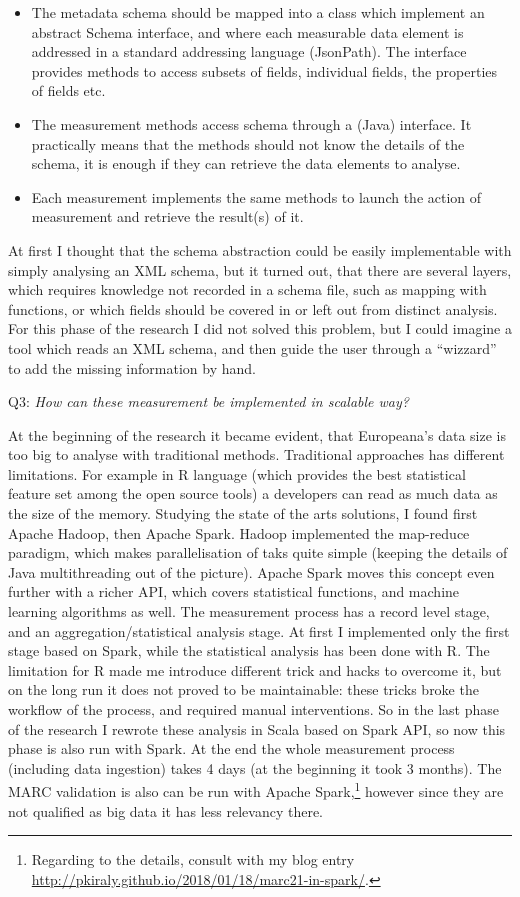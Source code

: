 \begin{itemize}
  \item The metadata schema should be mapped into a class which implement an abstract Schema interface, and where each measurable data element is addressed in a standard addressing language (JsonPath). The interface provides methods to access subsets of fields, individual fields, the properties of fields etc.
  \item The measurement methods access schema through a (Java) interface. It practically means that the methods should not know the details of the schema, it is enough if they can retrieve the data elements to analyse.
  \item Each measurement implements the same methods to launch the action of measurement and retrieve the result(s) of it.
\end{itemize}

At first I thought that the schema abstraction could be easily implementable with simply analysing an XML schema, but it turned out, that there are several layers, which requires knowledge not recorded in a schema file, such as mapping with functions, or which fields should be covered in or  left out from distinct analysis. For this phase of the research I did not solved this problem, but I could imagine a tool which reads an XML schema, and then guide the user through a ``wizzard'' to add the missing information by hand.


Q3: \emph{How can these measurement be implemented in scalable way?}

At the beginning of the research it became evident, that Europeana's data size is too big to analyse with traditional methods. Traditional approaches has different limitations. For example in R language (which provides the best statistical feature set among the open source tools) a developers can read as much data as the size of the memory. Studying the state of the arts solutions, I found first Apache Hadoop, then Apache Spark. Hadoop implemented the map-reduce paradigm, which makes parallelisation of taks quite simple (keeping the details of Java multithreading out of the picture). Apache Spark moves this concept even further with a richer API, which covers statistical functions, and machine learning algorithms as well. The measurement process has a record level stage, and an aggregation/statistical analysis stage. At first I implemented only the first stage based on Spark, while the statistical analysis has been done with R. The limitation for R made me introduce different trick and hacks to overcome it, but on the long run it does not proved to be maintainable: these tricks broke the workflow of the process, and required manual interventions. So in the last phase of the research I rewrote these analysis in Scala based on Spark API, so now this phase is also run with Spark. At the end the whole measurement process (including data ingestion) takes 4 days (at the beginning it took 3 months). The MARC validation is also can be run with Apache Spark,\footnote{Regarding to the details, consult with my blog entry \url{http://pkiraly.github.io/2018/01/18/marc21-in-spark/}.} however since they are not qualified as big data it has less relevancy there.

